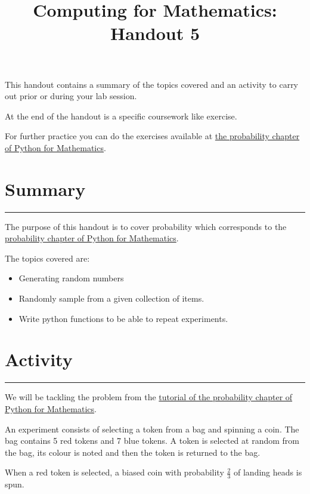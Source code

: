 \documentclass{article}
\title{Computing for Mathematics: Handout 5}
\date{}
\begin{document}
\maketitle


This handout contains a summary of the topics covered and an activity to
carry out prior or during your lab session.

At the end of the handout is a specific coursework like exercise.

For further practice you can do the exercises available at 
\href{https://vknight.org/pfm/tools-for-mathematics/06-probability/introduction/main.html}{the
probability chapter of Python for Mathematics}.

\section{Summary}\label{summary}
\hrule


The purpose of this handout is to cover probability which
corresponds to the
\href{https://vknight.org/pfm/tools-for-mathematics/06-probability/introduction/main.html}{probability
chapter of Python for Mathematics}.

The topics covered are:

\begin{itemize}
\item
  Generating random numbers
\item
  Randomly sample from a given collection of items.
\item 
  Write python functions to be able to repeat experiments.
\end{itemize}


\section{Activity}\label{activity}
\hrule

We will be tackling the problem from the
\href{https://vknight.org/pfm/tools-for-mathematics/06-probability/tutorial/main.html}{tutorial
of the probability chapter of Python for Mathematics}.

An experiment consists of selecting a token from a bag and spinning a coin. The
bag contains 5 red tokens and 7 blue tokens. A token is selected at random from
the bag, its colour is noted and then the token is returned to the bag.

When a red token is selected, a biased coin with probability \(\frac{2}{3}\) of landing heads is
spun.
\end{document}
